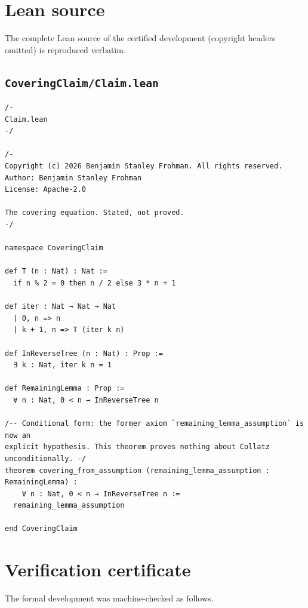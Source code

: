\documentclass[11pt]{amsart}
\theoremstyle{definition}
\theoremstyle{remark}
\begin{document}
\appendix
\section{Lean source}
The complete Lean source of the certified development (copyright headers omitted) is reproduced verbatim.
\subsection*{\texttt{CoveringClaim/Claim.lean}}
\begin{verbatim}
/-
Claim.lean
-/

/-
Copyright (c) 2026 Benjamin Stanley Frohman. All rights reserved.
Author: Benjamin Stanley Frohman
License: Apache-2.0

The covering equation. Stated, not proved.
-/

namespace CoveringClaim

def T (n : Nat) : Nat :=
  if n % 2 = 0 then n / 2 else 3 * n + 1

def iter : Nat → Nat → Nat
  | 0, n => n
  | k + 1, n => T (iter k n)

def InReverseTree (n : Nat) : Prop :=
  ∃ k : Nat, iter k n = 1

def RemainingLemma : Prop :=
  ∀ n : Nat, 0 < n → InReverseTree n

/-- Conditional form: the former axiom `remaining_lemma_assumption` is now an
explicit hypothesis. This theorem proves nothing about Collatz unconditionally. -/
theorem covering_from_assumption (remaining_lemma_assumption : RemainingLemma) :
    ∀ n : Nat, 0 < n → InReverseTree n :=
  remaining_lemma_assumption

end CoveringClaim
\end{verbatim}

\section{Verification certificate}\label{app:verification-certificate}

The formal development was machine-checked as follows.
\end{document}
